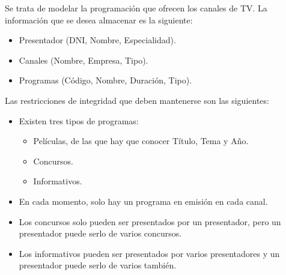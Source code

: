 \begin{ejercicio} \label{ej:11}
    Se trata de modelar la programación que ofrecen los canales de TV. La información que se desea almacenar
    es la siguiente:
    \begin{itemize}
        \item Presentador (DNI, Nombre, Especialidad).
        \item Canales (Nombre, Empresa, Tipo).
        \item Programas (Código, Nombre, Duración, Tipo).
    \end{itemize}
    Las restricciones de integridad que deben mantenerse son las siguientes:
    \begin{itemize}
        \item Existen tres tipos de programas:
        \begin{itemize}
            \item Películas, de las que hay que conocer Título, Tema y Año.
            \item Concursos.
            \item Informativos.
        \end{itemize}
        \item En cada momento, solo hay un programa en emisión en cada canal.
        \item Los concursos solo pueden ser presentados por un presentador, pero un presentador puede serlo de varios concursos.
        \item Los informativos pueden ser presentados por varios presentadores y un presentador puede serlo de varios también.
    \end{itemize}
\end{ejercicio}

